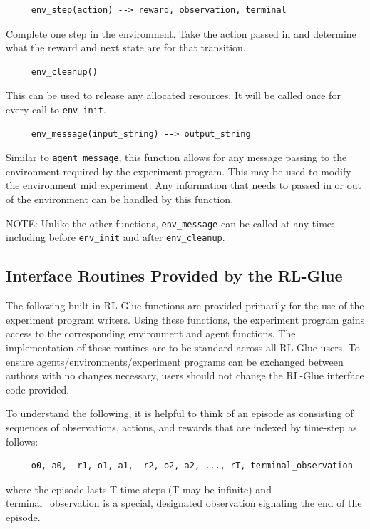 \documentclass[11pt]{article}
\begin{document}
\begin{verbatim}
     env_step(action) --> reward, observation, terminal\end{verbatim}
Complete one step in the environment. Take the action passed in and determine what the reward and next state are for that transition.

\begin{verbatim}                 
     env_cleanup()\end{verbatim}
This can be used to release any allocated resources. It will be called once for every call to \texttt{env\_init}.

\begin{verbatim}
     env_message(input_string) --> output_string
\end{verbatim}
Similar to \texttt{agent\_message}, this function allows for any message passing to the environment required by the experiment program. This may be used to modify the environment mid experiment. Any information that needs to passed in or out of the environment can be handled by this function.

NOTE: Unlike the other functions, \texttt{env\_message} can be called at any time: including before \texttt{env\_init} and after \texttt{env\_cleanup}.

\subsection{Interface Routines Provided by the RL-Glue}

The following built-in RL-Glue functions are provided primarily for the use of the experiment program writers. Using these functions, the experiment program gains access to the corresponding environment and agent functions. The implementation of these routines are to be standard across all RL-Glue users. To ensure agents/environments/experiment programs can be exchanged between authors with no changes necessary, users should not change the RL-Glue interface code provided.


To understand the following, it is helpful to think of an episode as consisting of sequences of observations, actions, and rewards that are indexed by time-step as follows:
\begin{verbatim}
     o0, a0,  r1, o1, a1,  r2, o2, a2, ..., rT, terminal_observation
\end{verbatim}
where the episode lasts T time steps (T may be infinite) and terminal\_observation is a special, designated observation signaling the end of the episode.
\end{document}
